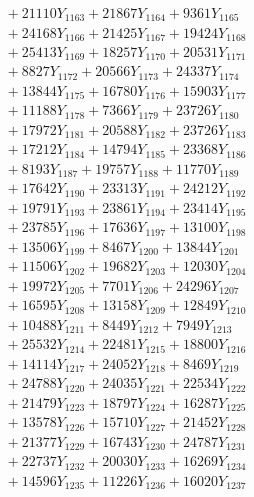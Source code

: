 \documentclass[a4paper,10pt]{article}
\begin{document}
{\begin{align}
&\;  + 21110 Y_{1163} + 21867 Y_{1164} + 9361 Y_{1165} \\[0.3ex]
&\;  + 24168 Y_{1166} + 21425 Y_{1167} + 19424 Y_{1168} \\[0.5ex]\allowbreak
&\;  + 25413 Y_{1169} + 18257 Y_{1170} + 20531 Y_{1171} \\[0.3ex]
&\;  + 8827 Y_{1172} + 20566 Y_{1173} + 24337 Y_{1174} \\[0.3ex]
&\;  + 13844 Y_{1175} + 16780 Y_{1176} + 15903 Y_{1177} \\[0.3ex]
&\;  + 11188 Y_{1178} + 7366 Y_{1179} + 23726 Y_{1180} \\[0.3ex]
&\;  + 17972 Y_{1181} + 20588 Y_{1182} + 23726 Y_{1183} \\[0.3ex]
&\;  + 17212 Y_{1184} + 14794 Y_{1185} + 23368 Y_{1186} \\[0.3ex]
&\;  + 8193 Y_{1187} + 19757 Y_{1188} + 11770 Y_{1189} \\[0.3ex]
&\;  + 17642 Y_{1190} + 23313 Y_{1191} + 24212 Y_{1192} \\[0.3ex]
&\;  + 19791 Y_{1193} + 23861 Y_{1194} + 23414 Y_{1195} \\[0.3ex]
&\;  + 23785 Y_{1196} + 17636 Y_{1197} + 13100 Y_{1198} \\[0.5ex]\allowbreak
&\;  + 13506 Y_{1199} + 8467 Y_{1200} + 13844 Y_{1201} \\[0.3ex]
&\;  + 11506 Y_{1202} + 19682 Y_{1203} + 12030 Y_{1204} \\[0.3ex]
&\;  + 19972 Y_{1205} + 7701 Y_{1206} + 24296 Y_{1207} \\[0.3ex]
&\;  + 16595 Y_{1208} + 13158 Y_{1209} + 12849 Y_{1210} \\[0.3ex]
&\;  + 10488 Y_{1211} + 8449 Y_{1212} + 7949 Y_{1213} \\[0.3ex]
&\;  + 25532 Y_{1214} + 22481 Y_{1215} + 18800 Y_{1216} \\[0.3ex]
&\;  + 14114 Y_{1217} + 24052 Y_{1218} + 8469 Y_{1219} \\[0.3ex]
&\;  + 24788 Y_{1220} + 24035 Y_{1221} + 22534 Y_{1222} \\[0.3ex]
&\;  + 21479 Y_{1223} + 18797 Y_{1224} + 16287 Y_{1225} \\[0.3ex]
&\;  + 13578 Y_{1226} + 15710 Y_{1227} + 21452 Y_{1228} \\[0.5ex]\allowbreak
&\;  + 21377 Y_{1229} + 16743 Y_{1230} + 24787 Y_{1231} \\[0.3ex]
&\;  + 22737 Y_{1232} + 20030 Y_{1233} + 16269 Y_{1234} \\[0.3ex]
&\;  + 14596 Y_{1235} + 11226 Y_{1236} + 16020 Y_{1237} \\[0.3ex]

\end{align}}
\end{document}
